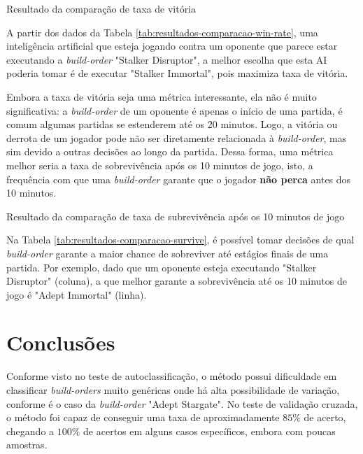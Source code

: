 \begin{table}[H]
\centering
\caption{Resultado da comparação de taxa de vitória}
\label{tab:resultados-comparacao-win-rate}
\begin{adjustbox}{width=1\textwidth}

\end{adjustbox}
\end{table}

A partir dos dados da Tabela \ref{tab:resultados-comparacao-win-rate}, uma inteligência artificial que esteja jogando contra um oponente que parece estar executando a \textit{\gls{build-order}} "Stalker Disruptor", a melhor escolha que esta AI poderia tomar é de executar "Stalker Immortal", pois maximiza taxa de vitória.

Embora a taxa de vitória seja uma métrica interessante, ela não é muito significativa: a \textit{\gls{build-order}} de um oponente é apenas o início de uma partida, é comum algumas partidas se estenderem até os 20 minutos. Logo, a vitória ou derrota de um jogador pode não ser diretamente relacionada à \textit{\gls{build-order}}, mas sim devido a outras decisões ao longo da partida. Dessa forma, uma métrica melhor seria a taxa de sobrevivência após os 10 minutos de jogo, isto, a frequência com que uma \textit{\gls{build-order}} garante que o jogador \textbf{não perca} antes dos 10 minutos.

\begin{table}[H]
\centering
\caption{Resultado da comparação de taxa de subrevivência após os 10 minutos de jogo}
\label{tab:resultados-comparacao-survive}
\begin{adjustbox}{width=1\textwidth}

\end{adjustbox}
\end{table}

Na Tabela \ref{tab:resultados-comparacao-survive}, é possível tomar decisões de qual \textit{\gls{build-order}} garante a maior chance de sobreviver até estágios finais de uma partida. Por exemplo, dado que um oponente esteja executando "Stalker Disruptor" (coluna), a que melhor garante a sobrevivência até os 10 minutos de jogo é "Adept Immortal" (linha).


	\chapter{Conclusões}
Conforme visto no teste de autoclassificação, o método possui dificuldade em classificar \textit{\glspl{build-order}} muito genéricas onde há alta possibilidade de variação, conforme é o caso da \textit{\gls{build-order}} "Adept Stargate". No teste de validação cruzada, o método foi capaz de conseguir uma taxa de aproximadamente $85\%$ de acerto, chegando a $100\%$ de acertos em alguns casos específicos, embora com poucas amostras.

